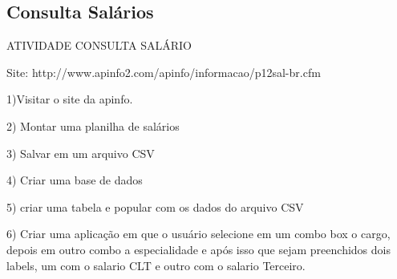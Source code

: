 	\subsection{Consulta Salários}

	\begin{frame}
	
	
	
	
	\begin{CaixaModelo01}{ATIVIDADE CONSULTA SALÁRIO}
	
	Site: http://www.apinfo2.com/apinfo/informacao/p12sal-br.cfm
	
		1)Visitar o site da apinfo. 
		
		2) Montar uma planilha de salários
	
		3) Salvar em um arquivo CSV
		
		4) Criar uma base de dados
		
		5) criar uma tabela e popular com os dados do arquivo CSV
		
		6) Criar uma aplicação em que o usuário selecione em um combo box
		o cargo, depois em outro combo a especialidade e após isso
		que sejam preenchidos dois labels, um com o salario CLT e outro com
		o salario Terceiro.
				

	\end{CaixaModelo01}

	\end{frame}